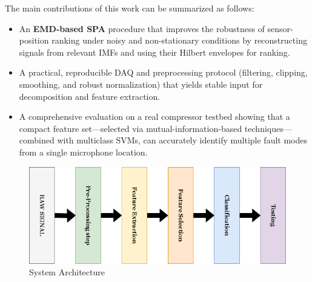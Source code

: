 \documentclass[12pt,a4paper]{article}
\begin{document}
\begin{multicols}{2}
The main contributions of this work can be summarized as follows:
\begin{itemize}
  \item An \textbf{EMD-based SPA} procedure that improves the robustness of sensor-position ranking under noisy and non-stationary conditions by reconstructing signals from relevant IMFs and using their Hilbert envelopes for ranking.
  \item A practical, reproducible DAQ and preprocessing protocol (filtering, clipping, smoothing, and robust normalization) that yields stable input for decomposition and feature extraction.
  \item A comprehensive evaluation on a real compressor testbed showing that a compact feature set—selected via mutual-information-based techniques—combined with multiclass SVMs, can accurately identify multiple fault modes from a single microphone location.
\end{itemize}
\end{multicols}
\begin{figure}[H]
    \centering
    \includegraphics[width=0.75\linewidth]{Diagrams/icbmintro.drawio.png}
    \caption{System Architecture}
    \label{fig:sysarch}
\end{figure}
\end{document}
